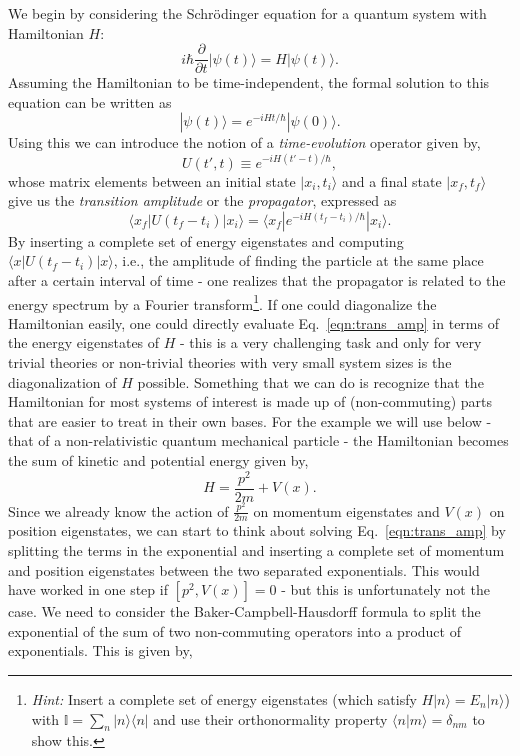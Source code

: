 \documentclass[11pt]{article}
\theoremstyle{definition}
\begin{document}
We begin by considering the Schrödinger equation for a quantum system with Hamiltonian $H$:
\begin{equation}
i\hbar \frac{\partial}{\partial t} |\psi(t)\rangle = H |\psi(t)\rangle.
\end{equation}
Assuming the Hamiltonian to be time-independent, the formal solution to this equation can be written as
\begin{equation}
|\psi(t)\rangle = e^{-iHt/\hbar} |\psi(0)\rangle.
\end{equation}
Using this we can introduce the notion of a \textit{time-evolution} operator given by,
\begin{equation}
  U(t',t) \equiv e^{-iH(t'-t)/\hbar},
\end{equation}
whose matrix elements between an initial state $|x_i, t_i\rangle$ and a final state $|x_f, t_f\rangle$ give us the \textit{transition amplitude} or the \textit{propagator}, expressed as
\begin{equation}\label{eqn:trans_amp}
\langle x_f |U(t_f-t_i)| x_i \rangle = \langle x_f | e^{-iH(t_f - t_i)/\hbar} | x_i \rangle.
\end{equation}
By inserting a complete set of energy eigenstates and computing $\langle x |U(t_f-t_i)| x \rangle$, i.e., the amplitude of finding the particle at the same place after a certain interval of time - one realizes that the propagator is related to the energy spectrum by a Fourier transform\footnote{\textit{Hint:} Insert a complete set of energy eigenstates (which satisfy $H | n \rangle = E_n |n \rangle$) with $\mathbb{I} = \sum_n |n\rangle \langle n|$ and use their orthonormality property $\langle n|m \rangle = \delta_{nm}$ to show this.}.
If one could diagonalize the Hamiltonian easily, one could directly evaluate Eq.~\eqref{eqn:trans_amp} in terms of the energy eigenstates of $H$ - this is a very challenging task and only for very trivial theories or non-trivial theories with very small system sizes is the diagonalization of $H$ possible. Something that we can do is recognize that the Hamiltonian for most systems of interest is made up of (non-commuting) parts that are easier to treat in their own bases. For the example we will use below - that of a non-relativistic quantum mechanical particle - the Hamiltonian becomes the sum of kinetic and potential energy given by,
\begin{equation}\label{eqn:hamiltonian}
  H = \frac{p^2}{2 m} + V(x).
\end{equation}
Since we already know the action of $\frac{p^2}{2 m}$ on momentum eigenstates and $V(x)$ on position eigenstates, we can start to think about solving Eq.~\eqref{eqn:trans_amp} by splitting the terms in the exponential and inserting a complete set of momentum and position eigenstates between the two separated exponentials. This would have worked in one step if $[p^2,V(x)]=0$ - but this is unfortunately not the case. We need to consider the Baker-Campbell-Hausdorff formula to split the exponential of the sum of two non-commuting operators into a product of exponentials. This is given by,
\end{document}
